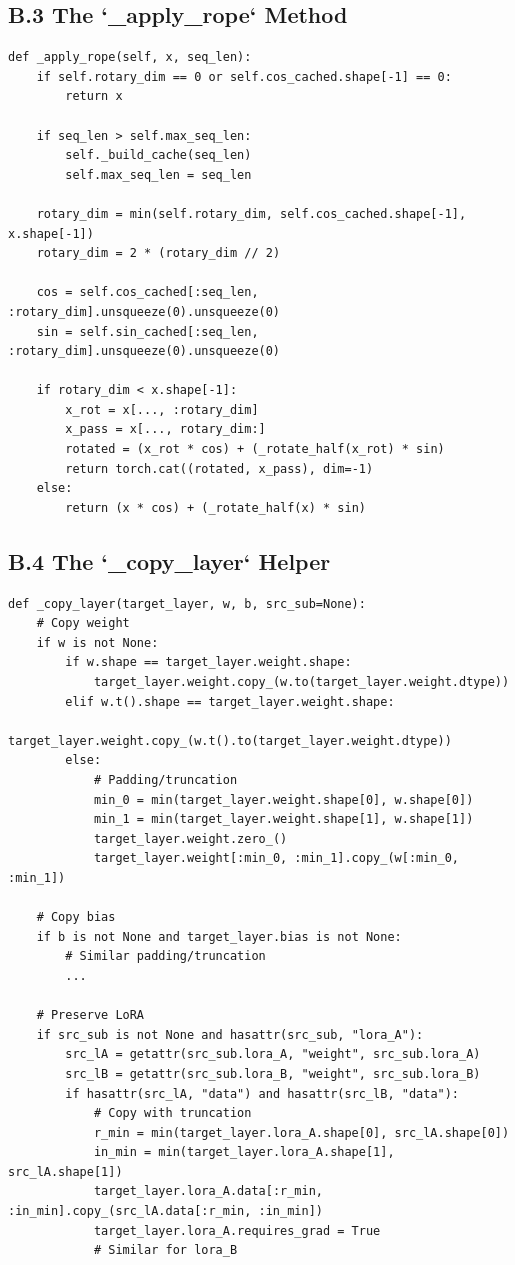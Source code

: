 \subsection{B.3 The `\_apply\_rope` Method}

\begin{lstlisting}
def _apply_rope(self, x, seq_len):
    if self.rotary_dim == 0 or self.cos_cached.shape[-1] == 0:
        return x
    
    if seq_len > self.max_seq_len:
        self._build_cache(seq_len)
        self.max_seq_len = seq_len
    
    rotary_dim = min(self.rotary_dim, self.cos_cached.shape[-1], x.shape[-1])
    rotary_dim = 2 * (rotary_dim // 2)
    
    cos = self.cos_cached[:seq_len, :rotary_dim].unsqueeze(0).unsqueeze(0)
    sin = self.sin_cached[:seq_len, :rotary_dim].unsqueeze(0).unsqueeze(0)
    
    if rotary_dim < x.shape[-1]:
        x_rot = x[..., :rotary_dim]
        x_pass = x[..., rotary_dim:]
        rotated = (x_rot * cos) + (_rotate_half(x_rot) * sin)
        return torch.cat((rotated, x_pass), dim=-1)
    else:
        return (x * cos) + (_rotate_half(x) * sin)
\end{lstlisting}

\subsection{B.4 The `\_copy\_layer` Helper}

\begin{lstlisting}
def _copy_layer(target_layer, w, b, src_sub=None):
    # Copy weight
    if w is not None:
        if w.shape == target_layer.weight.shape:
            target_layer.weight.copy_(w.to(target_layer.weight.dtype))
        elif w.t().shape == target_layer.weight.shape:
            target_layer.weight.copy_(w.t().to(target_layer.weight.dtype))
        else:
            # Padding/truncation
            min_0 = min(target_layer.weight.shape[0], w.shape[0])
            min_1 = min(target_layer.weight.shape[1], w.shape[1])
            target_layer.weight.zero_()
            target_layer.weight[:min_0, :min_1].copy_(w[:min_0, :min_1])
    
    # Copy bias
    if b is not None and target_layer.bias is not None:
        # Similar padding/truncation
        ...
    
    # Preserve LoRA
    if src_sub is not None and hasattr(src_sub, "lora_A"):
        src_lA = getattr(src_sub.lora_A, "weight", src_sub.lora_A)
        src_lB = getattr(src_sub.lora_B, "weight", src_sub.lora_B)
        if hasattr(src_lA, "data") and hasattr(src_lB, "data"):
            # Copy with truncation
            r_min = min(target_layer.lora_A.shape[0], src_lA.shape[0])
            in_min = min(target_layer.lora_A.shape[1], src_lA.shape[1])
            target_layer.lora_A.data[:r_min, :in_min].copy_(src_lA.data[:r_min, :in_min])
            target_layer.lora_A.requires_grad = True
            # Similar for lora_B
\end{lstlisting}

